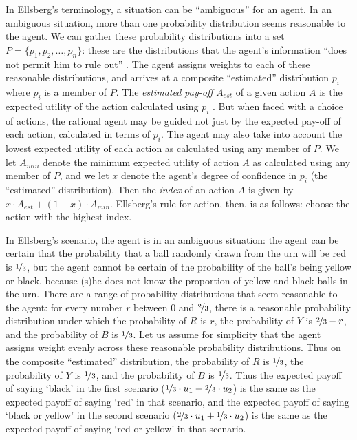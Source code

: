 In Ellsberg's terminology, a situation can be ``ambiguous'' for an agent. In an ambiguous situation, more than one probability distribution seems reasonable to the agent. We can gather these probability distributions into a set $P = \{p_1, p_2, \ldots, p_n\}$: these are the distributions that the agent's information ``does not permit him to rule out'' \citep[661]{Ellsberg1961}. The agent assigns weights to each of these reasonable distributions, and arrives at a composite ``estimated'' distribution $p_i$ where $p_i$ is a member of $P$. The \textit{estimated pay-off} $A_{est}$ of a given action $A$ is the expected utility of the action calculated using $p_i$ \citep[661]{Ellsberg1961}.  But when faced with a choice of actions, the rational agent may be guided not just by the expected pay-off of each action, calculated in terms of $p_i$. The agent may also take into account the lowest expected utility of each action as calculated using any member of $P$. We let $A_{min}$ denote the minimum expected utility of action $A$ as calculated using any member of $P$, and we let $x$ denote the agent's degree of confidence in $p_i$ (the ``estimated'' distribution). Then the \textit{index} of an action $A$ is given by $x \cdot A_{est} + (1-x) \cdot A_{min}$. Ellsberg's rule for action, then, is as follows: choose the action with the highest index. 

In Ellsberg's scenario, the agent is in an ambiguous situation: the agent can be certain that the probability that a ball randomly drawn from the urn will be red is $\nicefrac{1}{3}$, but the agent cannot be certain of the probability of the ball's being yellow or black, because (s)he does not know the proportion of yellow and black balls in the urn. There are a range of probability distributions that seem reasonable to the agent: for every number $r$ between $0$ and $\nicefrac{2}{3}$, there is a reasonable probability distribution under which the probability of $R$ is $r$, the probability of $Y$ is $\nicefrac{2}{3}-r$, and the probability of $B$ is $\nicefrac{1}{3}$. Let us assume for simplicity that the agent assigns weight evenly across these reasonable probability distributions. Thus on the composite ``estimated'' distribution, the probability of $R$ is $\nicefrac{1}{3}$, the probability of $Y$ is $\nicefrac{1}{3}$, and the probability of $B$ is $\nicefrac{1}{3}$. Thus the expected payoff of saying `black' in the first scenario ($\nicefrac{1}{3} \cdot u_1 + \nicefrac{2}{3} \cdot u_2$) is the same as the expected payoff of saying `red' in that scenario, and the expected payoff of saying `black or yellow' in the second scenario ($\nicefrac{2}{3} \cdot u_1 + \nicefrac{1}{3} \cdot u_2$) is the same as the expected payoff of saying `red or yellow' in that scenario.
 
